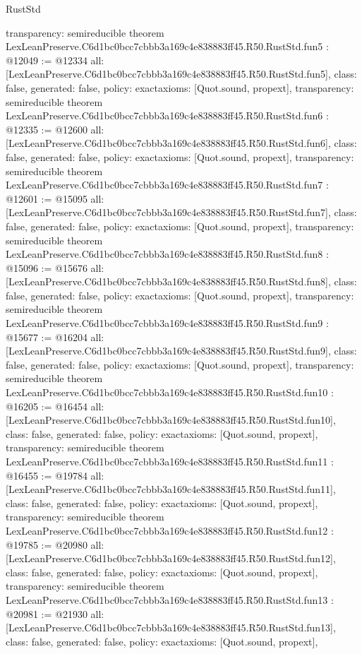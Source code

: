 \begin{lexlean}{RustStd}
\begin{coremodule}
{  transparency: semireducible
}
theorem LexLeanPreserve.C6d1bc0bcc7cbbb3a169c4e838883ff45.R50.RustStd.fun5 : @12049 := @12334 {
  all: [LexLeanPreserve.C6d1bc0bcc7cbbb3a169c4e838883ff45.R50.RustStd.fun5],
  class: false,
  generated: false,
  policy: exact{axioms: [Quot.sound, propext]},
  transparency: semireducible
}
theorem LexLeanPreserve.C6d1bc0bcc7cbbb3a169c4e838883ff45.R50.RustStd.fun6 : @12335 := @12600 {
  all: [LexLeanPreserve.C6d1bc0bcc7cbbb3a169c4e838883ff45.R50.RustStd.fun6],
  class: false,
  generated: false,
  policy: exact{axioms: [Quot.sound, propext]},
  transparency: semireducible
}
theorem LexLeanPreserve.C6d1bc0bcc7cbbb3a169c4e838883ff45.R50.RustStd.fun7 : @12601 := @15095 {
  all: [LexLeanPreserve.C6d1bc0bcc7cbbb3a169c4e838883ff45.R50.RustStd.fun7],
  class: false,
  generated: false,
  policy: exact{axioms: [Quot.sound, propext]},
  transparency: semireducible
}
theorem LexLeanPreserve.C6d1bc0bcc7cbbb3a169c4e838883ff45.R50.RustStd.fun8 : @15096 := @15676 {
  all: [LexLeanPreserve.C6d1bc0bcc7cbbb3a169c4e838883ff45.R50.RustStd.fun8],
  class: false,
  generated: false,
  policy: exact{axioms: [Quot.sound, propext]},
  transparency: semireducible
}
theorem LexLeanPreserve.C6d1bc0bcc7cbbb3a169c4e838883ff45.R50.RustStd.fun9 : @15677 := @16204 {
  all: [LexLeanPreserve.C6d1bc0bcc7cbbb3a169c4e838883ff45.R50.RustStd.fun9],
  class: false,
  generated: false,
  policy: exact{axioms: [Quot.sound, propext]},
  transparency: semireducible
}
theorem LexLeanPreserve.C6d1bc0bcc7cbbb3a169c4e838883ff45.R50.RustStd.fun10 : @16205 := @16454 {
  all: [LexLeanPreserve.C6d1bc0bcc7cbbb3a169c4e838883ff45.R50.RustStd.fun10],
  class: false,
  generated: false,
  policy: exact{axioms: [Quot.sound, propext]},
  transparency: semireducible
}
theorem LexLeanPreserve.C6d1bc0bcc7cbbb3a169c4e838883ff45.R50.RustStd.fun11 : @16455 := @19784 {
  all: [LexLeanPreserve.C6d1bc0bcc7cbbb3a169c4e838883ff45.R50.RustStd.fun11],
  class: false,
  generated: false,
  policy: exact{axioms: [Quot.sound, propext]},
  transparency: semireducible
}
theorem LexLeanPreserve.C6d1bc0bcc7cbbb3a169c4e838883ff45.R50.RustStd.fun12 : @19785 := @20980 {
  all: [LexLeanPreserve.C6d1bc0bcc7cbbb3a169c4e838883ff45.R50.RustStd.fun12],
  class: false,
  generated: false,
  policy: exact{axioms: [Quot.sound, propext]},
  transparency: semireducible
}
theorem LexLeanPreserve.C6d1bc0bcc7cbbb3a169c4e838883ff45.R50.RustStd.fun13 : @20981 := @21930 {
  all: [LexLeanPreserve.C6d1bc0bcc7cbbb3a169c4e838883ff45.R50.RustStd.fun13],
  class: false,
  generated: false,
  policy: exact{axioms: [Quot.sound, propext]},
}
\end{coremodule}
\end{lexlean}

